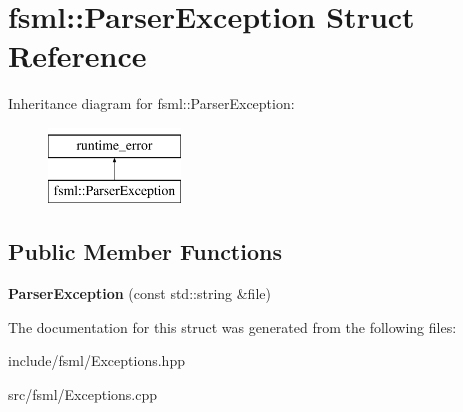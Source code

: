 \hypertarget{structfsml_1_1ParserException}{\section{fsml\-:\-:Parser\-Exception Struct Reference}
\label{structfsml_1_1ParserException}
}
Inheritance diagram for fsml\-:\-:Parser\-Exception\-:\begin{figure}[H]
\begin{center}
\leavevmode
\includegraphics[height=2.000000cm]{structfsml_1_1ParserException}
\end{center}
\end{figure}
\subsection*{Public Member Functions}
\begin{DoxyCompactItemize}
\item 
\hypertarget{structfsml_1_1ParserException_a022b04432a881271696b5e9e7f9df5af}{{\bfseries Parser\-Exception} (const std\-::string \&file)}\label{structfsml_1_1ParserException_a022b04432a881271696b5e9e7f9df5af}

\end{DoxyCompactItemize}


The documentation for this struct was generated from the following files\-:\begin{DoxyCompactItemize}
\item 
include/fsml/Exceptions.\-hpp\item 
src/fsml/Exceptions.\-cpp\end{DoxyCompactItemize}
